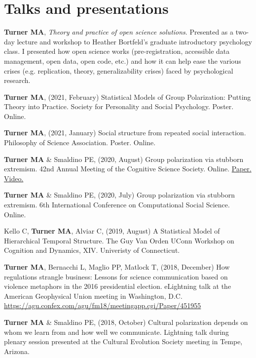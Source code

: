 \documentclass[letterpaper,11pt,oneside]{article}
\begin{document}
\noindent
\section*{\textcolor{gunmetal}{Talks and presentations}}

  \begin{hangparas}{0.25in}{1}
    \textbf{Turner MA}, \emph{Theory and practice of open science solutions}. Presented as a two-day lecture and workshop to Heather Bortfeld's graduate introductory psychology class. I presented how open science works (pre-registration, accessible data management, open data, open code, etc.) and how it can help ease the various crises (e.g. replication, theory, generalizability crises) faced by psychological research.

    \textbf{Turner MA}, (2021, February) Statistical Models of Group Polarization: Putting Theory into Practice. Society for Personality and Social Psychology. Poster. Online.

    \textbf{Turner MA}, (2021, January) Social structure from repeated social interaction. Philosophy of Science Association. Poster. Online.

    \textbf{Turner MA} \& Smaldino PE, (2020, August) Group polarization via stubborn extremism. 42nd Annual Meeting of the Cognitive Science Society. Online. \href{https://www.researchgate.net/publication/342153646_Stubborn_extremism_as_a_potential_pathway_to_group_polarization}{Paper.} \href{https://youtu.be/i5PHjwu1p40}{Video.}

   \textbf{Turner MA} \& Smaldino PE, (2020, July) Group polarization via stubborn extremism. 6th International Conference on Computational Social Science. Online.

Kello C, \textbf{Turner MA}, Alviar C, (2019, August) A Statistical Model of Hierarchical Temporal Structure. The Guy Van Orden UConn Workshop on Cognition and Dynamics, XIV. Univeristy of Connecticut.

\textbf{Turner MA}, Bernacchi L, Maglio PP, Matlock T, (2018, December) How regulations strangle business: Lessons for science communication based on violence metaphors in the 2016 presidential election. eLightning talk at the American Geophysical Union meeting in Washington, D.C. \url{https://agu.confex.com/agu/fm18/meetingapp.cgi/Paper/451955}

\textbf{Turner MA} \& Smaldino PE, (2018, October) Cultural polarization depends on whom we learn from and how well we communicate. Lightning talk during plenary session presented at the Cultural Evolution Society meeting in Tempe, Arizona.


\end{hangparas}
\end{document}
